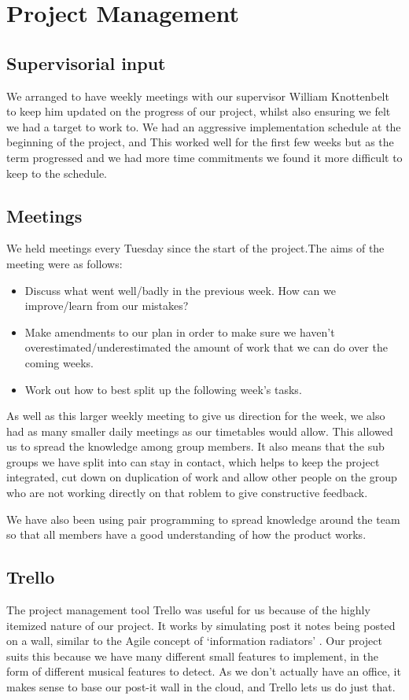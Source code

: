 \section{Project Management}
\subsection{Supervisorial input}
We arranged to have weekly meetings with our supervisor William Knottenbelt to keep him updated on the progress of our project, whilst also ensuring we felt we had a target to work to. We had an aggressive implementation schedule at the beginning of the project, and  This worked well for the first few weeks but as the term progressed and we had more time commitments we found it more difficult to keep to the schedule.
\subsection{Meetings}
We held meetings every Tuesday since the start of the project.The aims of the meeting were as follows:
\begin{itemize}
	\item Discuss what went well/badly in the previous week. How can we improve/learn from our mistakes?
	\item Make amendments to our plan in order to make sure we haven't overestimated/underestimated the amount of work that we can do over the coming weeks.
	\item Work out how to best split up the following week's tasks.
\end{itemize}
As well as this larger weekly meeting to give us direction for the week, we also had as many smaller daily meetings as our timetables would allow. This allowed us to spread the knowledge among group members. It also means that the sub groups we have split into can stay in contact, which helps to keep the project integrated, cut down on duplication of work and allow other people on the group who are not working directly on that roblem to give constructive feedback.

We have also been using pair programming to spread knowledge around the team so that all members have a good understanding of how the product works. 

\subsection{Trello}
The project management tool Trello was useful for us because of the highly itemized nature of our project. It works by simulating post it notes being posted on a wall, similar to the Agile concept of \lq information radiators' . Our project suits this because we have many different small features to implement, in the form of different musical features to detect.  As we don't actually have an office, it makes sense to base our post-it wall in the cloud, and Trello lets us do just that.


